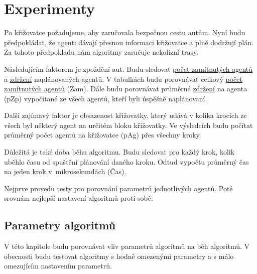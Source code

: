 \chapter{Experimenty}\label{ch:experimenty}


Po křižovatce požadujeme, aby zaručovala bezpečnou cestu autům.
Nyní budu předpokládat, že agenti dávají přesnou informaci křižovatce a plně dodržují plán.
Za tohoto předpokladu nám algoritmy zaručuje nekolizní trasy.

Následujícím faktorem je zpoždění aut.
Budu sledovat \hyperref[par:zamitnuti]{počet zamítnutých agentů} a \hyperref[par:zdrzeni]{zdržení} naplánovaných agentů.
V tabulkách budu porovnávat celkový \hyperref[par:zamitnuti]{počet zamítnutých agentů} (Zam).
Dále budu porovnávat průměrné \hyperref[par:zdrzeni]{zdržení} na agenta (pZp) vypočítané ze všech agentů,
kteří byli úspěšně naplánovaní.

Další zajímavý faktor je obsazenost křižovatky,
který udává v kolika krocích ze všech byl některý agent na určitém bloku křižovatky.
Ve výsledcích budu počítat průměrný počet agentů na křižovatce (pAg) přes všechny kroky.

Důležitá je také doba běhu algoritmu.
Budu sledovat pro každý krok, kolik uběhlo času od spuštění plánování daného kroku.
Odtud vypočtu průměrný čas na jeden krok v~mikrosekundách (Čas).

Nejprve provedu testy pro porovnání parametrů jednotlivých agentů.
Poté srovnám nejlepší nastavení algoritmů proti sobě.






\section{Parametry algoritmů}\label{sec:parametry_algoritmu}

%

V této kapitole budu porovnávat vliv parametrů algoritmů na běh algoritmů.
V obecnosti budu testovat algoritmy s hodně omezenými parametry a s málo omezujícím nastavením parametrů.

